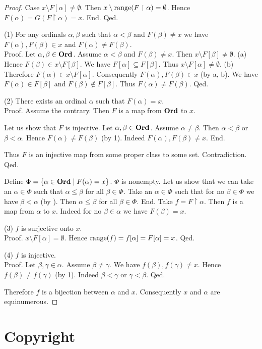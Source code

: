 \documentclass{article}
\begin{document}
\begin{forthel}
\begin{proof}
        Case $x \setminus F[\alpha] \neq \emptyset$.
          Then $x \setminus \textrm{range}(F \restriction \alpha) = \emptyset$.
          Hence $F(\alpha)
            = G(F \restriction \alpha)
            = x$.
        End.
      Qed.

      (1) For any ordinals $\alpha, \beta$ such that $\alpha < \beta$ and $F(\beta) \neq x$ we have $F(\alpha), F(\beta) \in x$ and $F(\alpha) \neq F(\beta)$. \\
      Proof.
        Let $\alpha, \beta \in \textbf{Ord}$.
        Assume $\alpha < \beta$ and $F(\beta) \neq x$.
        Then $x \setminus F[\beta] \neq \emptyset$.
        (a) Hence $F(\beta) \in x \setminus F[\beta]$.
        We have $F[\alpha] \subseteq F[\beta]$.
        Thus $x \setminus F[\alpha] \neq \emptyset$.
        (b) Therefore $F(\alpha) \in x \setminus F[\alpha]$.
        Consequently $F(\alpha), F(\beta) \in x$ (by a, b).
        We have $F(\alpha) \in F[\beta]$ and $F(\beta) \notin F[\beta]$.
        Thus $F(\alpha) \neq F(\beta)$.
      Qed.

      (2) There exists an ordinal $\alpha$ such that $F(\alpha) = x$. \\
      Proof.
        Assume the contrary.
        Then $F$ is a map from $\textbf{Ord}$ to $x$.

        Let us show that $F$ is injective.
          Let $\alpha, \beta \in \textbf{Ord}$.
          Assume $\alpha \neq \beta$.
          Then $\alpha < \beta$ or $\beta < \alpha$.
          Hence $F(\alpha) \neq F(\beta)$ (by 1).
          Indeed $F(\alpha), F(\beta) \neq x$.
        End.

        Thus $F$ is an injective map from some proper class to some set.
        Contradiction.
      Qed.

      Define $\Phi = \{ \alpha \in \textbf{Ord} \mid F(\alpha) = x \}$.
      $\Phi$ is nonempty.
      Let us show that we can take an $\alpha \in \Phi$ such that $\alpha \leq \beta$ for all $\beta \in \Phi$.
        Take an $\alpha \in \Phi$ such that for no $\beta \in \Phi$ we have $\beta < \alpha$ (by ).
        Then $\alpha \leq \beta$ for all $\beta \in \Phi$.
      End.
      Take $f = F \restriction \alpha$.
      Then $f$ is a map from $\alpha$ to $x$.
      Indeed for no $\beta \in \alpha$ we have $F(\beta) = x$.

      (3) $f$ is surjective onto $x$. \\
      Proof.
        $x \setminus F[\alpha] = \emptyset$.
        Hence $\textrm{range}(f)
          = f[\alpha]
          = F[\alpha]
          = x$.
      Qed.

      (4) $f$ is injective. \\
      Proof.
        Let $\beta, \gamma \in \alpha$.
        Assume $\beta \neq \gamma$.
        We have $f(\beta), f(\gamma) \neq x$.
        Hence $f(\beta) \neq f(\gamma)$ (by 1).
        Indeed $\beta < \gamma$ or $\gamma < \beta$.
      Qed.

      Therefore $f$ is a bijection between $\alpha$ and $x$.
      Consequently $x$ and $\alpha$ are equinumerous.
    \end{proof}
  \end{forthel}

  \printbibliography

  \section*{Copyright}
  \doclicenseThis
\end{document}
